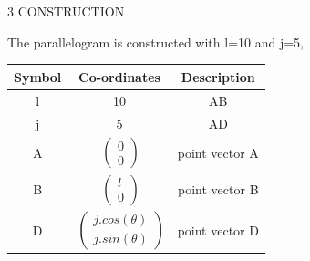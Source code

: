\documentclass[a4paper,12pt]{report}
\begin{document}
\begin{multicols}{2}
\vspace{2mm}\\
\vspace{2mm}\\
\centering \large\textsc{3  C}\footnotesize\textsc{ONSTRUCTION}\vspace{5mm}\\
\raggedright\large{The parallelogram is constructed with l=10 and j=5,} 
\begin{center}
    \label{tab:truthtable}
    \setlength{\arrayrulewidth}{0.2mm}
\setlength{\tabcolsep}{5pt}
\renewcommand{\arraystretch}{1.25}
    \begin{tabular}{|c|c|c|}
    \hline %
      \large\textbf{Symbol} & \large\textbf{Co-ordinates} & \large\textbf{Description}\\
      \hline
	\large l & 10 & \large AB \\
	\large j & 5 & \large AD\\
	\large A &  $\ \begin{pmatrix} 0\\0 \end{pmatrix}$  & \large point vector A\\
	\large B &  $\ \begin{pmatrix} l\\0 \end{pmatrix}$ & \large point vector B\\
	\large D &  $\ \begin{pmatrix} j.cos(\theta)\\j.sin(\theta) \end{pmatrix}$ & \large point vector D\\ 

\end{tabular}
\end{center}
\end{multicols}
\end{document}
